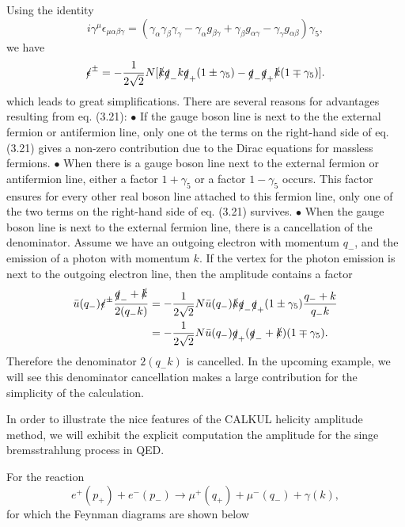 Using the identity
\begin{equation}
i\gamma^\mu\epsilon_{\mu\alpha\beta\gamma}=(\gamma_\alpha\gamma_\beta\gamma_\gamma-\gamma_\alpha g_{\beta\gamma}+\gamma_\beta g_{\alpha\gamma}-\gamma_\gamma g_{\alpha\beta})\gamma_5,
\end{equation}
we have 
\begin{equation}
\slashed \epsilon^\pm=-\frac{1}{2\sqrt{2}}N[\slashed k\slashed q_- k\slashed q_+(1\pm\gamma_5)-\slashed q_- \slashed q_+\slashed k(1\mp\gamma_5)].
\end{equation}
which leads to great simplifications. There are several reasons for advantages resulting from eq. (3.21):
\newline$\bullet$ \quad If the gauge boson line is next to the the external fermion or antifermion line, only one ot the terms on the right-hand side of eq. (3.21) gives a non-zero contribution due to the Dirac equations for massless fermions.
\newline$\bullet$ \quad When there is a gauge boson line next to the external fermion or antifermion line, either a factor $1+\gamma_5$ or a factor $1-\gamma_5$ occurs. This factor ensures for every other real boson line attached to this fermion line, only one of the two terms on the right-hand side of eq. (3.21) survives. 
\newline$\bullet$ \quad When the gauge boson line is next to the external fermion line, there is a cancellation of the denominator. Assume we have an outgoing electron with momentum $q_-$, and the emission of a photon  with momentum $k$. If the vertex for the photon emission is next to the outgoing electron line, then the amplitude contains a factor
\begin{align}
\bar{u}(q_-)\slashed\epsilon^\pm\frac{\slashed q_-+\slashed k}{2(q_-k)}&=-\frac{1}{2\sqrt{2}}N\bar{u}(q_-)\slashed k\slashed q_-\slashed q_+(1\pm\gamma_5)\frac{q_-+k}{q_-k}\nonumber\\
&=-\frac{1}{2\sqrt{2}}N\bar{u}(q_-)\slashed q_+(\slashed q_-+\slashed k)(1\mp\gamma_5).
\end{align}
Therefore the denominator $2(q_-k)$ is cancelled. In the upcoming example, we will see this denominator cancellation makes a large contribution for the simplicity of the calculation.

In order to illustrate the nice features of the CALKUL helicity amplitude method, we will exhibit the explicit computation the amplitude for the singe bremsstrahlung process in QED.

For the reaction
\begin{equation}
e^+(p_+)+e^-(p_-)\to\mu^+(q_+)+\mu^-(q_-)+\gamma(k),
\end{equation}
for which the Feynman diagrams are shown below

